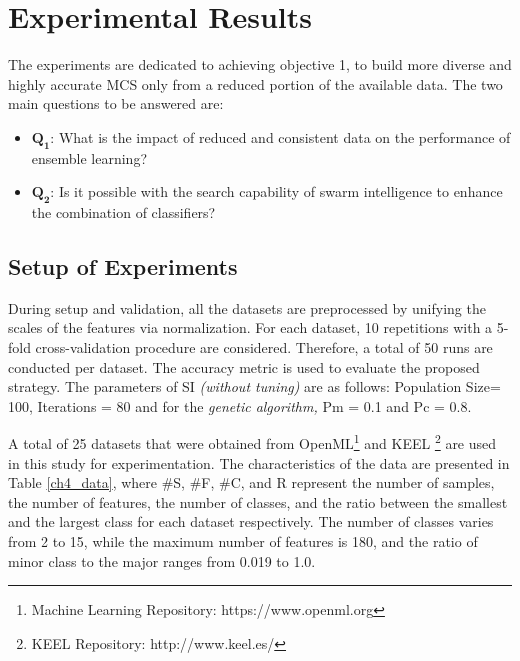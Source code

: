 %
%



\section{Experimental Results}
\label{sec:4_5_Expsetup}

The experiments are dedicated to achieving objective 1, to build more diverse and highly accurate MCS only from a reduced portion of the available data. The two main questions to be answered are:
\begin{itemize}
\setlength{\itemindent}{-.5in}

    \item $\pmb{Q_1}$: What is the impact of reduced and consistent data on the performance of ensemble learning?
    \item  $\pmb{Q_2}$: Is it possible with the search capability of swarm intelligence to enhance the combination of classifiers? 
\end{itemize}
 

\subsection{Setup of Experiments}
 During setup and validation, all the datasets are preprocessed by unifying the scales of the features via normalization. For each dataset, 10 repetitions with a 5-fold cross-validation procedure are considered. Therefore, a total of 50 runs are conducted per dataset. The accuracy metric is used to evaluate the proposed strategy. The parameters of SI \textit{(without tuning)} are as follows: Population Size= 100, Iterations = 80 and for the \textit{ genetic algorithm,} Pm = 0.1 and Pc = 0.8. 


A total of 25 datasets that were obtained from OpenML\footnote{ Machine Learning Repository: https://www.openml.org} and KEEL \footnote{KEEL Repository: http://www.keel.es/} are used in this study for experimentation. The characteristics of the data are presented in Table \ref{ch4_data}, where \#S, \#F, \#C, and R represent the number of samples, the number of features, the number of classes, and the ratio between the smallest and the largest class for each dataset respectively. The number of classes varies from 2 to 15, while the maximum number of features is 180, and the ratio of minor class to the major ranges from 0.019 to 1.0.
\vspace*{.3cm}

